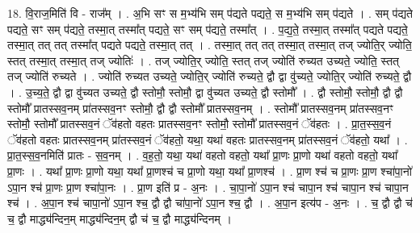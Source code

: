 \documentclass[17pt]{extarticle}
\begin{document}
18. वि॒राज॒मिति॑ वि - राज᳚म् । . अ॒भि सꣳ स म॒भ्य॑भि सम् प॑द्यते पद्यते॒ स म॒भ्य॑भि सम् प॑द्यते । . सम् प॑द्यते पद्यते॒ सꣳ सम् प॑द्यते॒ तस्मा॒त् तस्मा᳚त् पद्यते॒ सꣳ सम् प॑द्यते॒ तस्मा᳚त् । . प॒द्य॒ते॒ तस्मा॒त् तस्मा᳚त् पद्यते पद्यते॒ तस्मा॒त् तत् तत् तस्मा᳚त् पद्यते पद्यते॒ तस्मा॒त् तत् । . तस्मा॒त् तत् तत् तस्मा॒त् तस्मा॒त् तज् ज्योति॒र् ज्योति॒ स्तत् तस्मा॒त् तस्मा॒त् तज् ज्योतिः॑ । . तज् ज्योति॒र् ज्योति॒ स्तत् तज् ज्योति॑ रुच्यत उच्यते॒ ज्योति॒ स्तत् तज् ज्योति॑ रुच्यते । . ज्योति॑ रुच्यत उच्यते॒ ज्योति॒र् ज्योति॑ रुच्यते॒ द्वौ द्वा वु॑च्यते॒ ज्योति॒र् ज्योति॑ रुच्यते॒ द्वौ । . उ॒च्य॒ते॒ द्वौ द्वा वु॑च्यत उच्यते॒ द्वौ स्तोमौ॒ स्तोमौ॒ द्वा वु॑च्यत उच्यते॒ द्वौ स्तोमौ᳚ । . द्वौ स्तोमौ॒ स्तोमौ॒ द्वौ द्वौ स्तोमौ᳚ प्रातस्सव॒नम् प्रा॑तस्सव॒नꣳ स्तोमौ॒ द्वौ द्वौ स्तोमौ᳚ प्रातस्सव॒नम् । . स्तोमौ᳚ प्रातस्सव॒नम् प्रा॑तस्सव॒नꣳ स्तोमौ॒ स्तोमौ᳚ प्रातस्सव॒नं ॅव॑हतो वहतः प्रातस्सव॒नꣳ स्तोमौ॒ स्तोमौ᳚ प्रातस्सव॒नं ॅव॑हतः । . प्रा॒त॒स्स॒व॒नं ॅव॑हतो वहतः प्रातस्सव॒नम् प्रा॑तस्सव॒नं ॅव॑हतो॒ यथा॒ यथा॑ वहतः प्रातस्सव॒नम् प्रा॑तस्सव॒नं ॅव॑हतो॒ यथा᳚ । . प्रा॒त॒स्स॒व॒नमिति॑ प्रातः - स॒व॒नम् । . व॒ह॒तो॒ यथा॒ यथा॑ वहतो वहतो॒ यथा᳚ प्रा॒णः प्रा॒णो यथा॑ वहतो वहतो॒ यथा᳚ प्रा॒णः । . यथा᳚ प्रा॒णः प्रा॒णो यथा॒ यथा᳚ प्रा॒णश्च॑ च प्रा॒णो यथा॒ यथा᳚ प्रा॒णश्च॑ । . प्रा॒ण श्च॑ च प्रा॒णः प्रा॒ण श्चा॑पा॒नो॑ ऽपा॒न श्च॑ प्रा॒णः प्रा॒ण श्चा॑पा॒नः । . प्रा॒ण इति॑ प्र - अ॒नः । . चा॒पा॒नो॑ ऽपा॒न श्च॑ चापा॒न श्च॑ चापा॒न श्च॑ चापा॒न श्च॑ । . अ॒पा॒न श्च॑ चापा॒नो॑ ऽपा॒न श्च॒ द्वौ द्वौ चा॑पा॒नो॑ ऽपा॒न श्च॒ द्वौ । . अ॒पा॒न इत्य॑प - अ॒नः । . च॒ द्वौ द्वौ च॑ च॒ द्वौ माद्ध्य॑न्दिन॒म् माद्ध्य॑न्दिन॒म् द्वौ च॑ च॒ द्वौ माद्ध्य॑न्दिनम् । \newline
\end{document}
